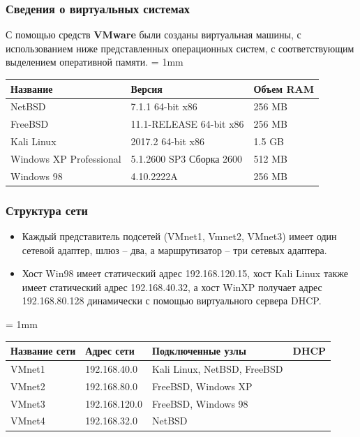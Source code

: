 \documentclass[9pt, compress]{beamer}
\newcommand{\cmark}{\ding{52}}%
\newcommand{\xmark}{\ding{56}}
\begin{document}
\begin{frame}
\frametitle{Сведения о виртуальных системах}
С помощью средств \textbf{VMware} были созданы виртуальная машины, с использованием ниже представленных операционных систем, с соответствующим выделением оперативной памяти.
\tabulinesep = 1mm
\begin{longtabu} to \textwidth {|X[ c , m ] |X[2, c , m ] | X[ c , m ]|}\firsthline\hline
\textbf{Название}&\textbf{Версия}&\textbf{Объем RAM}\\ \hline \endfirsthead
NetBSD&7.1.1 64-bit x86&256 MB\\ \hline
FreeBSD&11.1-RELEASE 64-bit x86&256 MB\\ \hline
Kali Linux&2017.2 64-bit x86&1.5 GB\\ \hline
Windows XP Professional&5.1.2600 SP3 Сборка 2600&512 MB\\ \hline
Windows 98&4.10.2222A&256 MB\\ \hline
\end{longtabu}

\end{frame}

\begin{frame}
\frametitle{Структура сети}
\begin{itemize}
\item Каждый представитель подсетей (VMnet1, Vmnet2, VMnet3) имеет один сетевой адаптер, шлюз – два, а маршрутизатор – три сетевых адаптера.
\item Хост Win98 имеет статический адрес 192.168.120.15, хост Kali Linux также имеет статический адрес 192.168.40.32, а хост WinXP получает адрес 192.168.80.128 динамически с помощью виртуального сервера DHCP.
\end{itemize}
\tabulinesep = 1mm
\begin{longtabu} to \textwidth {|X[ c , m ] |X[ c , m ] | X[2, c , m ]|X[c , m ]|}\firsthline\hline

\textbf{Название сети}&\textbf{Адрес сети}&\textbf{Подключенные узлы}&\textbf{DHCP}\\ \hline \endfirsthead
	
VMnet1&192.168.40.0&Kali Linux, NetBSD, FreeBSD&\xmark\\ \hline
VMnet2&192.168.80.0&FreeBSD, Windows XP&\cmark\\ \hline
VMnet3&192.168.120.0&FreeBSD, Windows 98&\xmark\\ \hline
VMnet4&192.168.32.0&NetBSD&\cmark\\ \hline

\end{longtabu}
\end{frame}
\end{document}
